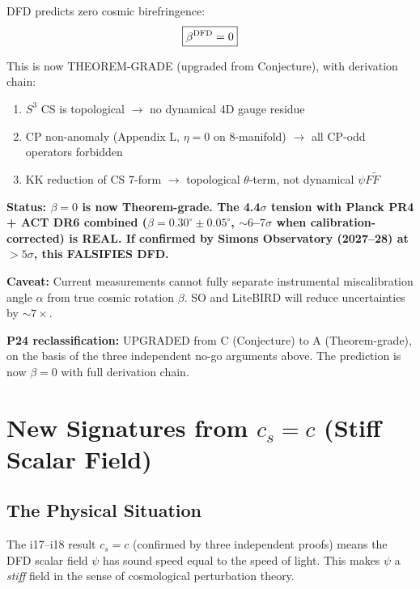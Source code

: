 \documentclass[11pt]{article}
\begin{document}
\begin{tcolorbox}[colback=red!5!white, colframe=red!60!black,
  title=\textbf{RESULT: $\beta = 0$ EXACTLY}]

DFD predicts zero cosmic birefringence:
\begin{equation}
\boxed{\beta^{\rm DFD} = 0}
\end{equation}

This is now THEOREM-GRADE (upgraded from Conjecture), with derivation
chain:
\begin{enumerate}
\item $S^3$ CS is topological $\to$ no dynamical 4D gauge residue
\item CP non-anomaly (Appendix L, $\eta = 0$ on 8-manifold)
  $\to$ all CP-odd operators forbidden
\item KK reduction of CS 7-form $\to$ topological $\theta$-term,
  not dynamical $\psi F\tilde{F}$
\end{enumerate}

\textbf{Status: $\beta = 0$ is now Theorem-grade.  The 4.4$\sigma$
tension with Planck PR4 + ACT DR6 combined ($\beta = 0.30^\circ
\pm 0.05^\circ$, $\sim 6$--$7\sigma$ when calibration-corrected)
is REAL.  If confirmed by Simons Observatory (2027--28) at
$> 5\sigma$, this FALSIFIES DFD.}

\textbf{Caveat:} Current measurements cannot fully separate
instrumental miscalibration angle $\alpha$ from true cosmic
rotation $\beta$.  SO and LiteBIRD will reduce uncertainties
by $\sim 7\times$.

\textbf{P24 reclassification:} UPGRADED from C (Conjecture) to
A (Theorem-grade), on the basis of the three independent no-go
arguments above.  The prediction is now $\beta = 0$ with full
derivation chain.
\end{tcolorbox}


\section{New Signatures from $c_s = c$ (Stiff Scalar Field)}
\label{sec:stiff}

\subsection{The Physical Situation}

The i17--i18 result $c_s = c$ (confirmed by three independent proofs)
means the DFD scalar field $\psi$ has sound speed equal to the speed
of light.  This makes $\psi$ a \emph{stiff} field in the sense of
cosmological perturbation theory.
\end{document}
